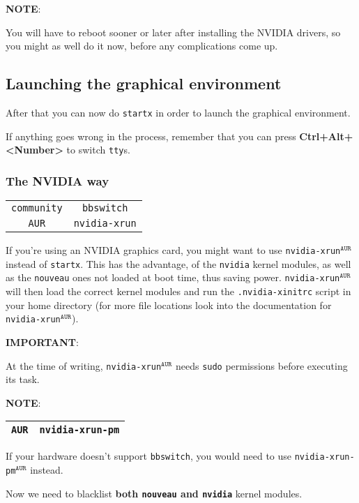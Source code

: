 \documentclass[9pt]{report}
\newcommand{\admonition}[2]{\textbf{#1}: {#2}}
\begin{document}
\admonition{NOTE}{You will have to reboot sooner or later after installing the NVIDIA drivers, so you might as well do it now, before any complications come up.

}

\vfill\eject

\hypertarget{x-launching-the-graphical-environment}{\subsection{Launching the graphical environment}}
After that you can now do \texttt{startx} in order to launch the graphical environment.


If anything goes wrong in the process, remember that you can press \textbf{Ctrl+Alt+<Number>} to switch \texttt{tty}s.



\vfill\eject

\hypertarget{x-the-nvidia-way}{\subsubsection{The NVIDIA way}}
\begin{center}
\begin{tabular}{|c|c|}
\hline
\texttt{community} & \texttt{bbswitch} \\ 
\texttt{AUR} & \texttt{nvidia-xrun} \\ 
\hline
\end{tabular}
\end{center}

If you’re using an NVIDIA graphics card, you might want to use \texttt{nvidia-xrun}${}^{\texttt{AUR}}$ instead of \texttt{startx}.
This has the advantage, of the \texttt{nvidia} kernel modules, as well as the \texttt{nouveau} ones not loaded at boot time, thus saving power.
\texttt{nvidia-xrun}${}^{\texttt{AUR}}$ will then load the correct kernel modules and run the \texttt{.nvidia-xinitrc} script in your home directory (for more file locations look into the documentation for \texttt{nvidia-xrun}${}^{\texttt{AUR}}$).


\admonition{IMPORTANT}{At the time of writing, \texttt{nvidia-xrun}${}^{\texttt{AUR}}$ needs \texttt{sudo} permissions before executing its task.

}
\admonition{NOTE}{\begin{center}
\begin{tabular}{|c|c|}
\hline
\texttt{AUR} & \texttt{nvidia-xrun-pm} \\ 
\hline
\end{tabular}
\end{center}

If your hardware doesn’t support \texttt{bbswitch}, you would need to use \texttt{nvidia-xrun-pm}${}^{\texttt{AUR}}$ instead.

}
Now we need to blacklist \textbf{both \texttt{nouveau} and \texttt{nvidia}} kernel modules.
\end{document}
